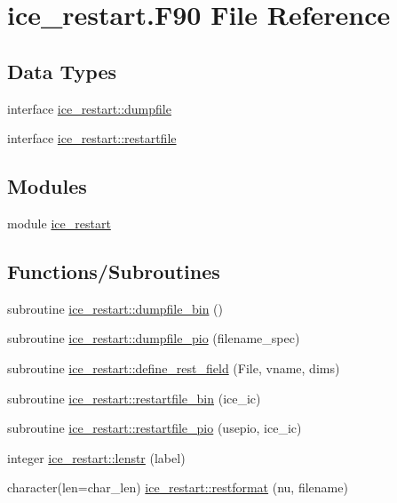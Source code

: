 \hypertarget{ice__restart_8F90}{
\section{ice\_\-restart.F90 File Reference}
\label{ice__restart_8F90}
}
\subsection*{Data Types}
\begin{DoxyCompactItemize}
\item 
interface \hyperlink{interfaceice__restart_1_1dumpfile}{ice\_\-restart::dumpfile}
\item 
interface \hyperlink{interfaceice__restart_1_1restartfile}{ice\_\-restart::restartfile}
\end{DoxyCompactItemize}
\subsection*{Modules}
\begin{DoxyCompactItemize}
\item 
module \hyperlink{namespaceice__restart}{ice\_\-restart}
\end{DoxyCompactItemize}
\subsection*{Functions/Subroutines}
\begin{DoxyCompactItemize}
\item 
subroutine \hyperlink{namespaceice__restart_af23e2fba277975028e2c7793dc27af3d}{ice\_\-restart::dumpfile\_\-bin} ()
\item 
subroutine \hyperlink{namespaceice__restart_a6e7b7e169c2a300f73a29cbe37f22219}{ice\_\-restart::dumpfile\_\-pio} (filename\_\-spec)
\item 
subroutine \hyperlink{namespaceice__restart_aa51583c33942714cd58c05544b96a5bd}{ice\_\-restart::define\_\-rest\_\-field} (File, vname, dims)
\item 
subroutine \hyperlink{namespaceice__restart_ad32165edb70403f5261f5d7e4f91e0ec}{ice\_\-restart::restartfile\_\-bin} (ice\_\-ic)
\item 
subroutine \hyperlink{namespaceice__restart_ab42c7fd99429cb9ca5ec096c45840c08}{ice\_\-restart::restartfile\_\-pio} (usepio, ice\_\-ic)
\item 
integer \hyperlink{namespaceice__restart_affff786ae56a7f09bc01c31d71a1333c}{ice\_\-restart::lenstr} (label)
\item 
character(len=char\_\-len) \hyperlink{namespaceice__restart_aba88448e14afbb601cdae9f2c86b6943}{ice\_\-restart::restformat} (nu, filename)
\end{DoxyCompactItemize}
